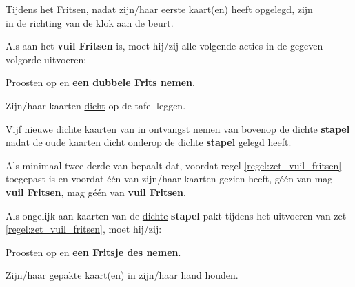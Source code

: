 
\vervolgLijst{}
    \item Tijdens het Fritsen, nadat \Willem zijn/haar eerste kaart(en) heeft opgelegd, zijn\\ \alleSpelers in de richting van de klok aan de beurt\footnotemark[4].
\eindLijst{}



\newpage
{}
\label{sec:vuil_fritsen}


\vervolgLijst{}
    \item Als \eenSpeler aan het \textbf{vuil Fritsen} is, moet hij/zij alle volgende acties in de gegeven volgorde uitvoeren:
    \puntLijst{}
        \item Proosten op  en \textbf{een dubbele Frits nemen}\footnotemark[2].
        \item Zijn/haar kaarten \ul{dicht} op de tafel leggen.
        \item Vijf nieuwe \ul{dichte} kaarten van \Frits in ontvangst nemen van bovenop de \ul{dichte} \textbf{stapel} nadat \Frits de \ul{oude} kaarten \ul{dicht} onderop de \ul{dichte} \textbf{stapel} gelegd heeft.
    \eindPuntLijst{}
     \label{regel:zet_vuil_fritsen}
\eindLijst{}

\vervolgLijst{}
    \item Als minimaal twee derde van \alleSpelers bepaalt dat, voordat regel \ref{regel:zet_vuil_fritsen} toegepast is en voordat \'e\'en van \alleSpelers zijn/haar kaarten gezien heeft, géén van \alleSpelers mag \textbf{vuil Fritsen}, mag géén van \alleSpelers \textbf{vuil Fritsen}.
    \label{regel:skip_vuil_fritsen}
\eindLijst{}

\vervolgLijst{}
    \item Als \eenSpeler ongelijk aan \Frits kaarten van de \ul{dichte} \textbf{stapel} pakt tijdens het uitvoeren van zet \ref{regel:zet_vuil_fritsen}, moet hij/zij:
    \puntLijst{}
        \item Proosten op  en \textbf{een Fritsje des nemen}\footnotemark[3].
        \item Zijn/haar gepakte kaart(en) in zijn/haar hand houden.
    \eindPuntLijst{}
\eindLijst{}


